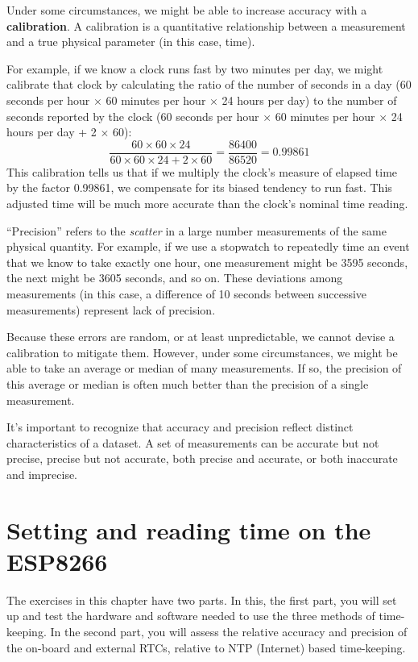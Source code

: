 Under some circumstances, we might be able to increase accuracy with a \textbf{calibration}.
A calibration is a quantitative relationship between a measurement and a true physical parameter (in this case, time).

For example, if we know a clock runs fast by two minutes per day, we might calibrate that clock by calculating the ratio of the number of seconds in a day (60 seconds per hour $\times$ 60 minutes per hour $\times$ 24 hours per day) to the number of seconds reported by the clock (60 seconds per hour $\times$ 60 minutes per hour $\times$ 24 hours per day + 2 $\times$ 60):
\[ 
\frac{60 \times 60 \times 24}{60 \times 60 \times 24 + 2 \times 60 } = \frac{86400}{86520} = 0.99861
 \]
This calibration tells us that if we multiply the clock's measure of elapsed time by the factor 0.99861, we compensate for its biased tendency to run fast.
This adjusted time will be much more accurate than the clock's nominal time reading.

``Precision'' refers to the \emph{scatter} in a large number measurements of the same physical quantity. 
For example, if we use a stopwatch to repeatedly time an event that we know to take exactly one hour, one measurement might be 3595 seconds, the next might be 3605 seconds, and so on. 
These deviations among measurements (in this case, a difference of 10 seconds between successive measurements) represent lack of precision. 

Because these errors are random, or at least unpredictable, we cannot devise a calibration to mitigate them. 
However, under some circumstances, we might be able to take an average or median of many measurements. 
If so, the precision of this average or median is often much better than the precision of a single measurement.

It's important to recognize that accuracy and precision reflect distinct characteristics of a dataset. 
A set of measurements can be accurate but not precise, precise but not accurate, both precise and accurate, or both inaccurate and imprecise. 


\section{Setting and reading time on the ESP8266}
The exercises in this chapter have two parts. 
In this, the first part, you will set up and test the hardware and software needed to use the three methods of time-keeping. 
In the second part, you will assess the relative accuracy and precision of the on-board and external RTCs, relative to NTP (Internet) based time-keeping.

